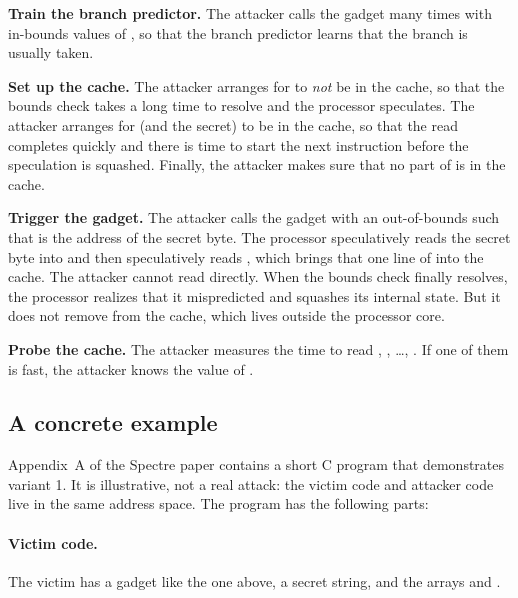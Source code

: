 \begin{compactenum}
  \item \textbf{Train the branch predictor.}
        The attacker calls the gadget many times with in-bounds values of
        , so that the branch predictor learns that the
         branch is usually taken.
  \item \textbf{Set up the cache.}
        The attacker arranges for  to \emph{not} be in
        the cache, so that the bounds check takes a long time to resolve
        and the processor speculates.
        The attacker arranges for  (and the secret) to be in
        the cache, so that the read  completes quickly and
        there is time to start the next instruction before the
        speculation is squashed.
        Finally, the attacker makes sure that no part of  is
        in the cache.
  \item \textbf{Trigger the gadget.}
        The attacker calls the gadget with an out-of-bounds  such
        that  is the address of the secret byte.
        The processor speculatively reads the secret byte into 
        and then speculatively reads , which brings
        that one line of  into the cache.
        The attacker cannot read  directly.
        When the bounds check finally resolves, the processor realizes that it
        mispredicted and squashes its internal state.
        But it does not remove  from the cache, which
        lives outside the processor core.
  \item \textbf{Probe the cache.}
        The attacker measures the time to read
        , , \ldots,
        .
        If one of them is fast, the attacker knows the value of .
\end{compactenum}

\subsection{A concrete example}

Appendix~A of the Spectre paper\autocite{kocher:spectre} contains a short C
program that demonstrates variant 1.
It is illustrative, not a real attack: the victim code and attacker
code live in the same address space.
The program has the following parts:

\paragraph{Victim code.}
The victim has a gadget like the one above, a secret string, and the
arrays  and .

